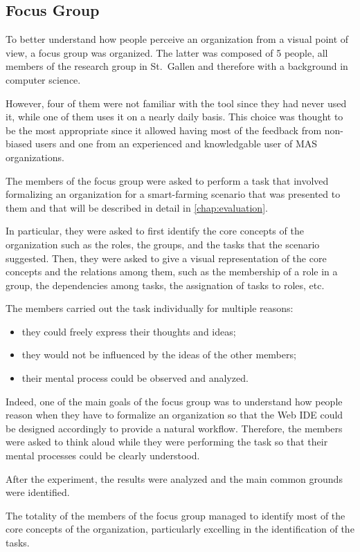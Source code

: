 \subsection{Focus Group}
To better understand how people perceive an organization from a visual point of view, a focus group was organized.
The latter was composed of 5 people, all members of the research group in St.\ Gallen and therefore with a background in computer science.

However, four of them were not familiar with the \moise{} tool since they had never used it, while one of them uses it on a nearly daily basis.
This choice was thought to be the most appropriate since it allowed having most of the feedback from non-biased users and one from an experienced and knowledgable user of MAS organizations.

The members of the focus group were asked to perform a task that involved formalizing an organization for a smart-farming scenario that was presented to them and that will be described in detail in \cref{chap:evaluation}.

In particular, they were asked to first identify the core concepts of the organization such as the roles, the groups, and the tasks that the scenario suggested.
Then, they were asked to give a visual representation of the core concepts and the relations among them, such as the membership of a role in a group, the dependencies among tasks, the assignation of tasks to roles, etc.

The members carried out the task individually for multiple reasons:
\begin{itemize}
    \item they could freely express their thoughts and ideas;
    \item they would not be influenced by the ideas of the other members;
    \item their mental process could be observed and analyzed.
\end{itemize}
Indeed, one of the main goals of the focus group was to understand how people reason when they have to formalize an organization so that the Web IDE could be designed accordingly to provide a natural workflow.
Therefore, the members were asked to think aloud while they were performing the task so that their mental processes could be clearly understood.

After the experiment, the results were analyzed and the main common grounds were identified.

The totality of the members of the focus group managed to identify most of the core concepts of the organization, particularly excelling in the identification of the tasks.

